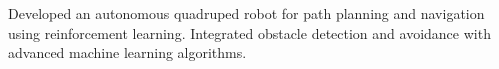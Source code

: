   {Developed an autonomous quadruped robot for path planning and navigation using reinforcement learning. Integrated obstacle detection and avoidance with advanced machine learning algorithms.}
